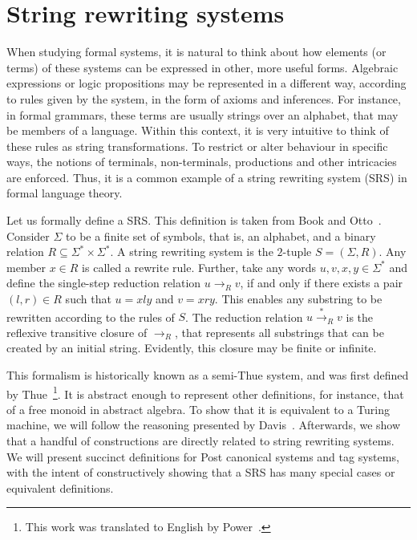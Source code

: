 \documentclass[12pt]{article}
\begin{document}
\section{String rewriting systems}\label{sec:srs}

When studying formal systems, it is natural to think about how elements (or terms) of these systems can be expressed in other, more useful forms. Algebraic expressions or logic propositions may be represented in a different way, according to rules given by the system, in the form of axioms and inferences. For instance, in formal grammars, these terms are usually strings over an alphabet, that may be members of a language. Within this context, it is very intuitive to think of these rules as string transformations. To restrict or alter behaviour in specific ways, the notions of terminals, non-terminals, productions and other intricacies are enforced. Thus, it is a common example of a string rewriting system (SRS) in formal language theory.

Let us formally define a SRS. This definition is taken from Book and Otto~\cite{}. Consider $\Sigma$ to be a finite set of symbols, that is, an alphabet, and a binary relation $R \subseteq \Sigma^{*} \times \Sigma^{*}$. A string rewriting system is the $2$-tuple $S = (\Sigma, R)$. Any member $x \in R$ is called a rewrite rule. Further, take any words $u, v, x, y \in \Sigma^{*}$ and define the single-step reduction relation $u \rightarrow_{R} v$, if and only if there exists a pair $(l, r) \in R$ such that $u = xly$ and $v = xry$. This enables any substring to be rewritten according to the rules of $S$. The reduction relation $u \stackrel{*}{\rightarrow}_{R} v$ is the reflexive transitive closure of $\rightarrow_{R}$, that represents all substrings that can be created by an initial string. Evidently, this closure may be finite or infinite.

This formalism is historically known as a semi-Thue system, and was first defined by Thue~\cite{}\footnote{This work was translated to English by Power~\cite{}.}. It is abstract enough to represent other definitions, for instance, that of a free monoid in abstract algebra. To show that it is equivalent to a Turing machine, we will follow the reasoning presented by Davis~\cite{}. Afterwards, we show that a handful of constructions are directly related to string rewriting systems. We will present succinct definitions for Post canonical systems and tag systems, with the intent of constructively showing that a SRS has many special cases or equivalent definitions.
\end{document}

